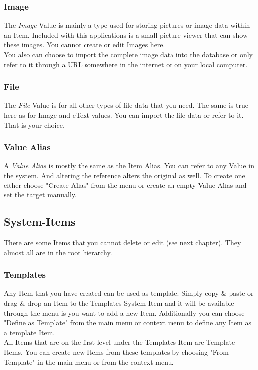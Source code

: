 \documentclass[12pt,a4]{article}
\begin{document}
\subsubsection{Image}
\label{image_datatype}
\medskip
The \textit{Image} Value is mainly a type used for storing pictures or image data within an Item. Included with this applications is a small picture viewer that can show these images. You cannot create or edit Images here. \\
You also can choose to import the complete image data into the database or only refer to it through a URL somewhere in the internet or on your local computer.
\subsubsection{File}
\label{file_datatype}
\medskip
The \textit{File} Value is for all other types of file data that you need. The same is true here as for Image and eText values. You can import the file data or refer to it. That is your choice. \\
\subsubsection{Value Alias}
\label{itemvalueref_datatype}
\medskip
A \textit{Value Alias} is mostly the same as the Item Alias. You can refer to any Value in the system. And altering the reference alters the original as well. To create one either choose "Create Alias" from the menu or create an empty Value Alias and set the target manually.
\subsection{System-Items}
\label{systemitems_datatype}
\medskip
There are some Items that you cannot delete or edit (see next chapter). They almost all are in the root hierarchy.
\subsubsection{Templates}
\label{templates_systemitem}
\medskip
Any Item that you have created can be used as template. Simply copy \& paste or drag \& drop an Item to the Templates System-Item and it will be available through the menu is you want to add a new Item. Additionally you can choose "Define as Template" from the main menu or context menu to define any Item as a template Item. \\
All Items that are on the first level under the Templates Item are Template Items. You can create new Items from these templates by choosing "From Template" in the main menu or from the context menu.
\end{document}
